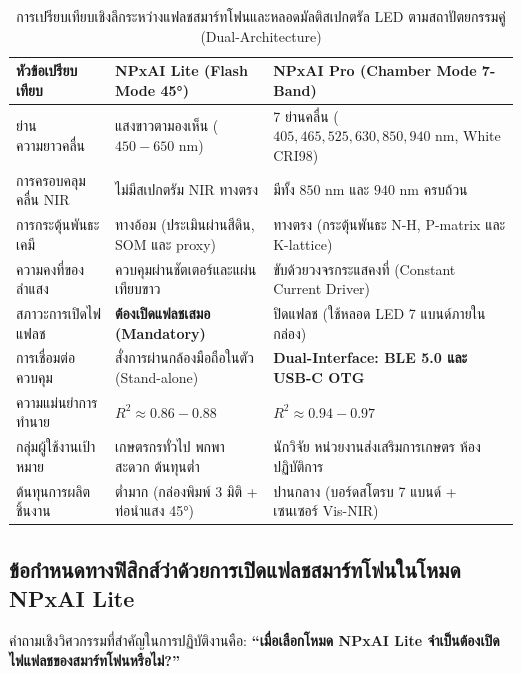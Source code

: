 \documentclass[12pt,a4paper,oneside]{book}
\begin{document}
\begin{table}[ht]
\caption{การเปรียบเทียบเชิงลึกระหว่างแฟลชสมาร์ทโฟนและหลอดมัลติสเปกตรัล LED ตามสถาปัตยกรรมคู่ (Dual-Architecture)}\label{tab:emitter_comparison}
\centering
\begin{tabularx}{\textwidth}{p{3.8cm}YY}
\toprule
\textbf{หัวข้อเปรียบเทียบ} & \textbf{NPxAI Lite (Flash Mode 45°)} & \textbf{NPxAI Pro (Chamber Mode 7-Band)} \\
\midrule
ย่านความยาวคลื่น & แสงขาวตามองเห็น ($450-650\text{ nm}$) & 7 ย่านคลื่น ($405, 465, 525, 630, 850, 940\text{ nm}$, White CRI98) \\
การครอบคลุมคลื่น NIR & ไม่มีสเปกตรัม NIR ทางตรง & มีทั้ง $850\text{ nm}$ และ $940\text{ nm}$ ครบถ้วน \\
การกระตุ้นพันธะเคมี & ทางอ้อม (ประเมินผ่านสีดิน, SOM และ proxy) & ทางตรง (กระตุ้นพันธะ N-H, P-matrix และ K-lattice) \\
ความคงที่ของลำแสง & ควบคุมผ่านชัตเตอร์และแผ่นเทียบขาว & ขับด้วยวงจรกระแสคงที่ (Constant Current Driver) \\
สภาวะการเปิดไฟแฟลช & \textbf{ต้องเปิดแฟลชเสมอ (Mandatory)} & ปิดแฟลช (ใช้หลอด LED 7 แบนด์ภายในกล่อง) \\
การเชื่อมต่อควบคุม & สั่งการผ่านกล้องมือถือในตัว (Stand-alone) & \textbf{Dual-Interface: BLE 5.0 และ USB-C OTG} \\
ความแม่นยำการทำนาย & $R^2 \approx 0.86 - 0.88$ & $R^2 \approx 0.94 - 0.97$ \\
กลุ่มผู้ใช้งานเป้าหมาย & เกษตรกรทั่วไป พกพาสะดวก ต้นทุนต่ำ & นักวิจัย หน่วยงานส่งเสริมการเกษตร ห้องปฏิบัติการ \\
ต้นทุนการผลิตชิ้นงาน & ต่ำมาก (กล่องพิมพ์ 3 มิติ + ท่อนำแสง 45°) & ปานกลาง (บอร์ดสโตรบ 7 แบนด์ + เซนเซอร์ Vis-NIR) \\
\bottomrule
\end{tabularx}
\end{table}

\subsection{ข้อกำหนดทางฟิสิกส์ว่าด้วยการเปิดแฟลชสมาร์ทโฟนในโหมด NPxAI Lite}
คำถามเชิงวิศวกรรมที่สำคัญในการปฏิบัติงานคือ: \textbf{``เมื่อเลือกโหมด NPxAI Lite จำเป็นต้องเปิดไฟแฟลชของสมาร์ทโฟนหรือไม่?''}
\end{document}
